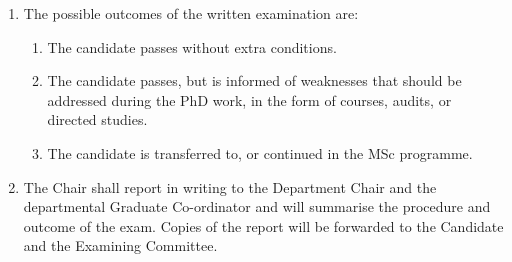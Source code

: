 \begin{enumerate}
\item The possible outcomes of the written examination are:
\begin{enumerate}
\item The candidate passes without extra conditions.
\item The candidate passes, but is informed of weaknesses that should be addressed during the PhD work, in the form of courses, audits, or directed studies.
\item The candidate is transferred to, or continued in the MSc programme.
\end{enumerate}

\item The Chair shall report in writing to the Department Chair and the departmental Graduate Co-ordinator and will summarise the procedure and outcome of the exam. Copies of the report will be forwarded to the Candidate and the Examining Committee.

\end{enumerate}

